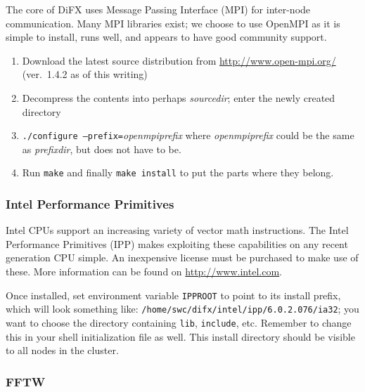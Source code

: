 The core of DiFX uses Message Passing Interface (MPI) for inter-node communication.
Many MPI libraries exist; we choose to use OpenMPI as it is simple to install, runs well, and appears to have good community support.
\begin{enumerate}
\item Download the latest source distribution from \url{http://www.open-mpi.org/} (ver.\ 1.4.2 as of this writing)
\item Decompress the contents into perhaps {\em sourcedir}; enter the newly created directory
\item {\tt ./configure --prefix=}{\em openmpiprefix} where {\em openmpiprefix} could be the same as {\em prefixdir}, but does not have to be.
\item Run {\tt make} and finally {\tt make install} to put the parts where they belong.
\end{enumerate}









\subsubsection{Intel Performance Primitives} \label{sec:ipp}

Intel CPUs support an increasing variety of vector math instructions.  
The Intel Performance Primitives (IPP) makes exploiting these capabilities on any recent generation CPU simple.
An inexpensive license must be purchased to make use of these.
More information can be found on \url{http://www.intel.com}.

Once installed, set environment variable {\tt IPPROOT} to point to its install prefix, which will look something like:
{\tt /home/swc/difx/intel/ipp/6.0.2.076/ia32}; you want to choose the directory containing {\tt lib}, {\tt include}, etc.
Remember to change this in your shell initialization file as well.
This install directory should be visible to all nodes in the cluster.









\subsubsection{FFTW} \label{sec:fftw}

